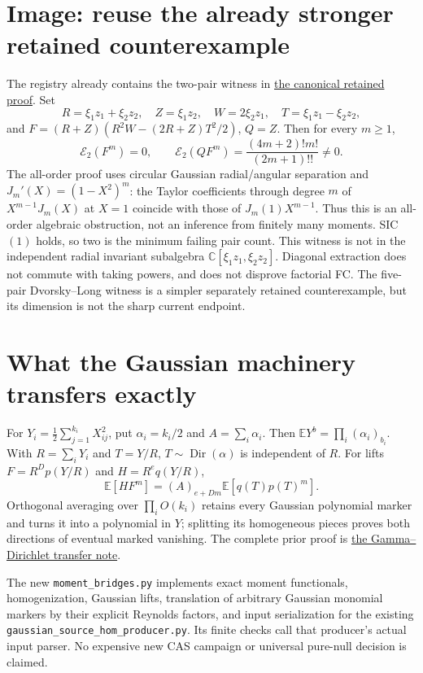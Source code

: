 \documentclass[11pt]{article}
\newcommand{\C}{\mathbb C}
\begin{document}
\section*{Image: reuse the already stronger retained counterexample}
The registry already contains the two-pair witness in
\href{../../archive/non-elliptic/extended-geometry/TWO_PAIR_IMAGE_MATHIEU_COUNTEREXAMPLE.md}{the canonical retained proof}.
Set
\[
 R=\xi_1z_1+\xi_2z_2,\quad Z=\xi_1z_2,\quad
 W=2\xi_2z_1,\quad T=\xi_1z_1-\xi_2z_2,
\]
and $F=(R+Z)(R^2W-(2R+Z)T^2/2)$, $Q=Z$. Then for every $m\geq1$,
\[
 \mathcal E_2(F^m)=0,\qquad
 \mathcal E_2(QF^m)=\frac{(4m+2)!m!}{(2m+1)!!}\ne0.          \tag{4}
\]
The all-order proof uses circular Gaussian radial/angular separation and
$J_m'(X)=(1-X^2)^m$: the Taylor coefficients through degree $m$ of
$X^{m-1}J_m(X)$ at $X=1$ coincide with those of $J_m(1)X^{m-1}$.
Thus this is an all-order algebraic obstruction, not an inference from
finitely many moments. SIC$(1)$ holds, so two is the minimum failing
pair count. This witness is not in the independent radial invariant
subalgebra $\C[\xi_1z_1,\xi_2z_2]$. Diagonal extraction does not commute
with taking powers, and does not disprove factorial FC.
The five-pair Dvorsky--Long witness is a simpler separately retained
counterexample, but its dimension is not the sharp current endpoint.

\section*{What the Gaussian machinery transfers exactly}
For $Y_i=\frac12\sum_{j=1}^{k_i}X_{ij}^2$, put
$\alpha_i=k_i/2$ and $A=\sum_i\alpha_i$. Then
$\mathbb E Y^b=\prod_i(\alpha_i)_{b_i}$. With $R=\sum_iY_i$ and $T=Y/R$,
$T\sim\operatorname{Dir}(\alpha)$ is independent of $R$.
For lifts $F=R^Dp(Y/R)$ and $H=R^eq(Y/R)$,
\[
 \mathbb E[HF^m]=(A)_{e+Dm}\mathbb E[q(T)p(T)^m].             \tag{5}
\]
Orthogonal averaging over $\prod_i O(k_i)$ retains every Gaussian
polynomial marker and turns it into a polynomial in $Y$; splitting its
homogeneous pieces proves both directions of eventual marked vanishing.
The complete prior proof is
\href{../cross-programme-connections/GAUSSIAN_GAMMA_DIRICHLET_AND_OUTWARD_TRANSFERS_2026_11_16.tex}{the Gamma--Dirichlet transfer note}.

The new \texttt{moment\_bridges.py} implements exact moment functionals,
homogenization, Gaussian lifts, translation of arbitrary Gaussian monomial
markers by their explicit Reynolds factors, and input serialization for
the existing \texttt{gaussian\_source\_hom\_producer.py}. Its finite checks
call that producer's actual input parser. No expensive new CAS campaign
or universal pure-null decision is claimed.
\end{document}
